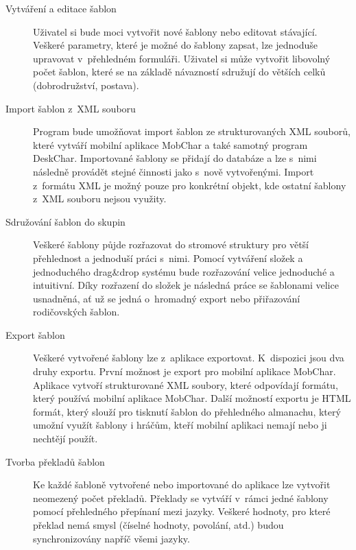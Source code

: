 \documentclass[thesis=B,czech]{resources/FITthesis}[2012/06/26]
\begin{document}
\begin{description}
\item[Vytváření a editace šablon] Uživatel si bude moci vytvořit nové šablony nebo editovat stávající. Veškeré parametry, které je možné do šablony zapsat, lze jednoduše upravovat v~přehledném formuláři. Uživatel si může vytvořit libovolný počet šablon, které se na základě návazností sdružují do větších celků (dobrodružství, postava).

\item[Import šablon z~XML souboru] Program bude umožňovat import šablon ze strukturovaných XML souborů, které vytváří mobilní aplikace MobChar a také samotný program DeskChar. Importované šablony se přidají do databáze a lze s~nimi následně provádět stejné činnosti jako s~nově vytvořenými. Import z~formátu XML je možný pouze pro konkrétní objekt, kde ostatní šablony z~XML souboru nejsou využity.

\item[Sdružování šablon do skupin] Veškeré šablony půjde rozřazovat do stromové struktury pro větší přehlednost a jednoduší práci s~nimi. Pomocí vytváření složek a jednoduchého drag\&drop systému bude rozřazování velice jednoduché a intuitivní. Díky rozřazení do složek je následná práce se šablonami velice usnadněná, ať už se jedná o~hromadný export nebo přiřazování rodičovských šablon.

\item[Export šablon] Veškeré vytvořené šablony lze z~aplikace exportovat. K~dispozici jsou dva druhy exportu. První možnost je export pro mobilní aplikace MobChar. Aplikace vytvoří strukturované XML soubory, které odpovídají formátu, který používá mobilní aplikace MobChar. Další možností exportu je HTML formát, který slouží pro tisknutí šablon do přehledného almanachu, který umožní využít šablony i hráčům, kteří mobilní aplikaci nemají nebo ji nechtějí použít. 

\item[Tvorba překladů šablon] Ke každé šabloně vytvořené nebo importované do aplikace lze vytvořit neomezený počet překladů. Překlady se vytváří v~rámci jedné šablony pomocí přehledného přepínaní mezi jazyky. Veškeré hodnoty, pro které překlad nemá smysl (číselné hodnoty, povolání, atd.) budou synchronizovány napříč všemi jazyky.
\end{description}
\end{document}

